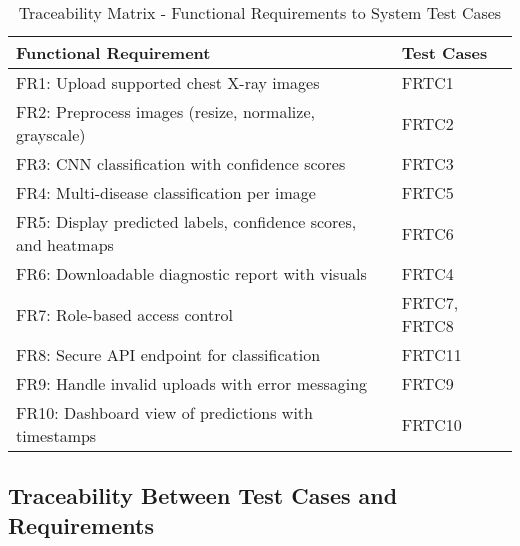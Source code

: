 \documentclass[12pt, titlepage]{article}
\begin{document}
\begin{table}[h]
  \centering
  \begin{tabular}{|p{}|p{}|}
    \hline
    \textbf{Functional Requirement} & \textbf{Test Cases} \\
    \hline
    FR1: Upload supported chest X-ray images & FRTC1 \\
    \hline
    FR2: Preprocess images (resize, normalize, grayscale) & FRTC2 \\
    \hline
    FR3: CNN classification with confidence scores & FRTC3 \\
    \hline
    FR4: Multi-disease classification per image & FRTC5 \\
    \hline
    FR5: Display predicted labels, confidence scores, and heatmaps & FRTC6 \\
    \hline
    FR6: Downloadable diagnostic report with visuals & FRTC4 \\
    \hline
    FR7: Role-based access control & FRTC7, FRTC8 \\
    \hline
    FR8: Secure API endpoint for classification & FRTC11 \\
    \hline
    FR9: Handle invalid uploads with error messaging & FRTC9 \\
    \hline
    FR10: Dashboard view of predictions with timestamps & FRTC10 \\
    \hline
  \end{tabular}
  \caption{Traceability Matrix - Functional Requirements to System Test Cases}
\end{table}
\pagebreak


\subsection{Traceability Between Test Cases and Requirements}
\end{document}
